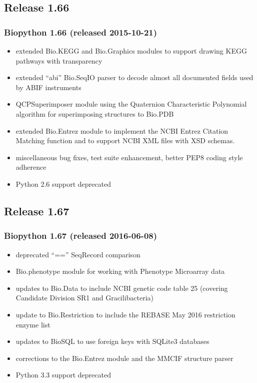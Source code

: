 \documentclass[trans]{beamer}
\begin{document}
\subsection*{Release 1.66}
\frame
{
  \frametitle{Biopython 1.66 (released 2015-10-21)}

  \begin{itemize}
  \item extended Bio.KEGG and Bio.Graphics modules to support drawing KEGG pathways with transparency
  \item extended ``abi'' Bio.SeqIO parser to decode almost all documented fields used by ABIF instruments
  \item QCPSuperimposer module using the Quaternion Characteristic Polynomial algorithm for superimposing structures to Bio.PDB
  \item extended Bio.Entrez module to implement the NCBI Entrez Citation Matching function and to support NCBI XML files with XSD schemas.
  \item miscellaneous bug fixes, test suite enhancement, better PEP8 coding style adherence
  \item Python 2.6 support deprecated
  \end{itemize}
}
\subsection*{Release 1.67}
\frame
{
  \frametitle{Biopython 1.67 (released 2016-06-08)}

  \begin{itemize}
  \item deprecated ``=='' SeqRecord comparison
  \item Bio.phenotype module for working with Phenotype Microarray data
  \item updates to Bio.Data to include NCBI genetic code table 25 (covering Candidate Division SR1 and Gracilibacteria)
  \item update to Bio.Restriction to include the REBASE May 2016 restriction enzyme list
  \item updates to BioSQL to use foreign keys with SQLite3 databases
  \item corrections to the Bio.Entrez module and the MMCIF structure parser
  \item Python 3.3 support deprecated
  \end{itemize}
}
\end{document}
